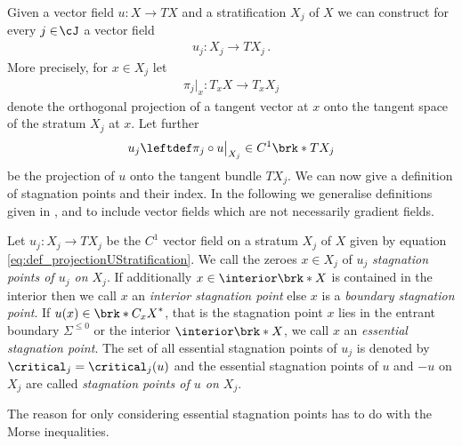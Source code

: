 Given a vector field $u\colon X\to TX$ and a stratification $X_j$ of $X$ we can construct for every
$j\in\!\cJ$ a vector field
\begin{align*}
  u_j\colon X_j\to TX_j\,.
\end{align*}
More precisely, for $x\in X_j$ let
\begin{align}
  \pi_j\big\vert_x\colon T_xX\to T_xX_{j}\label{eq:def_projectionStratification}
\end{align}
denote the orthogonal projection of a tangent vector at $x$ onto the tangent space of the stratum $X_j$ at $x$.
Let further
\begin{align}
  u_j\leftdef\pi_j\circ u\big\vert_{X_j}\in C^1\brk*{TX_j}\label{eq:def_projectionUStratification}
\end{align}
be the projection of $u$ onto the tangent bundle $TX_j$. We can now give a definition
of stagnation points and their index. 
In the following we generalise definitions given in \cite[p.138f]{Shelton1980}, \cite[§5]{Morse1969} and \cite[p.282f]{Morse1970}
to include vector fields which are not necessarily gradient fields.
\begin{definition}\label{df:stagnationPoints}
  Let $u_j\colon X_j\to TX_j$ be the $C^1$ vector field on a stratum $X_j$ of $X$ given by equation \eqref{eq:def_projectionUStratification}.
  We call the zeroes $x\in X_j$ of $u_j$ \emph{stagnation points of $u_j$ on $X_j$}.
  If additionally $x\in\openX$ is contained in the interior
  then we call $x$ an \emph{interior stagnation point}
  else $x$ is a \emph{boundary stagnation point}.
  If $u(x)\in\brk*{C_xX}^*$, that is the stagnation point $x$ lies in the entrant boundary $\Sigma^{\leq0}$ or the interior $\interior\brk*{X}$, we call $x$ an \emph{essential stagnation point}.
  The set of all essential stagnation points of $u_j$ is denoted by $\critical_j=\critical_j(u)$ and
  the essential stagnation points of $u$ and $-u$ on $X_j$ are called \emph{stagnation points of $u$ on $X_j$}.
\end{definition}
The reason for only considering essential stagnation points has to do with the Morse inequalities.
